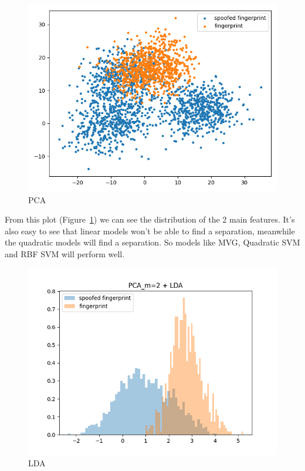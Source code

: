 \documentclass[english]{report}
\begin{document}
    \begin{figure}[H]
        \centering
        \includegraphics[scale=0.5]{../../images/feature_plot/PCA_m=2}
        \caption{PCA}
        \label{fig:PCA}
    \end{figure}

    From this plot (Figure~\ref{fig:PCA}) we can see the distribution of the 2 main features.
    It's also easy to see that linear models won't be able to find a separation, meanwhile the quadratic models will find a separation.
    So models like MVG, Quadratic SVM and RBF SVM will perform well.

    \begin{figure}[H]
        \centering
        \includegraphics[scale=0.5]{../../images/feature_plot/histPCA_m=2 + LDA}
        \caption{LDA}
        \label{fig:LDA}
    \end{figure}
\end{document}

